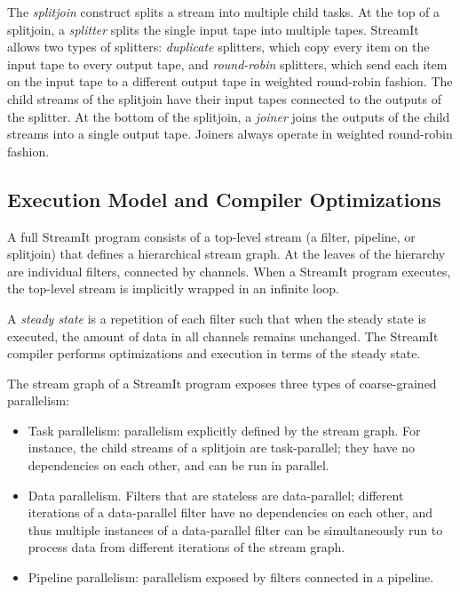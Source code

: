 The \emph{splitjoin} construct splits a stream into multiple child tasks. At the top of a splitjoin, a \emph{splitter} splits the single input tape into multiple tapes. StreamIt allows two types of splitters: \emph{duplicate} splitters, which copy every item on the input tape to every output tape, and \emph{round-robin} splitters, which send each item on the input tape to a different output tape in weighted round-robin fashion. The child streams of the splitjoin have their input tapes connected to the outputs of the splitter. At the bottom of the splitjoin, a \emph{joiner} joins the outputs of the child streams into a single output tape. Joiners always operate in weighted round-robin fashion.

\subsection{Execution Model and Compiler Optimizations}\label{ch:bg:str:exec}

A full StreamIt program consists of a top-level stream (a filter, pipeline, or splitjoin) that defines a hierarchical stream graph. At the leaves of the hierarchy are individual filters, connected by channels. When a StreamIt program executes, the top-level stream is implicitly wrapped in an infinite loop.

A \emph{steady state} is a repetition of each filter such that when the steady state is executed, the amount of data in all channels remains unchanged. The StreamIt compiler performs optimizations and execution in terms of the steady state.

The stream graph of a StreamIt program exposes three types of coarse-grained parallelism:
\begin{itemize}
\item Task parallelism: parallelism explicitly defined by the stream graph. For instance, the child streams of a splitjoin are task-parallel; they have no dependencies on each other, and can be run in parallel.
\item Data parallelism. Filters that are stateless are data-parallel; different iterations of a data-parallel filter have no dependencies on each other, and thus multiple instances of a data-parallel filter can be simultaneously run to process data from different iterations of the stream graph.
\item Pipeline parallelism: parallelism exposed by filters connected in a pipeline.
\end{itemize}

